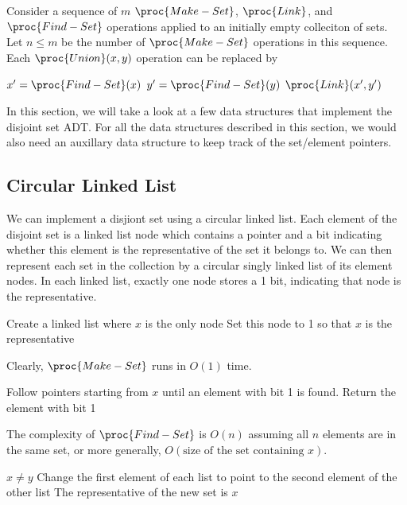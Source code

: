 Consider a sequence of $m$ $\proc{Make-Set}$, $\proc{Link}$, and $\proc{Find-Set}$ operations applied to an initially empty colleciton of sets. Let $n \leq m$ be the number of $\proc{Make-Set}$ operations in this sequence. Each $\proc{Union}(x,y)$ operation can be replaced by

\begin{codebox}
    \li $x' = \proc{Find-Set}(x)$
    \li $y' = \proc{Find-Set}(y)$
    \li $\proc{Link}(x',y')$
\end{codebox}

In this section, we will take a look at a few data structures that implement the disjoint set ADT. For all the data structures described in this section, we would also need an auxillary data structure to keep track of the set/element pointers.

\subsection{Circular Linked List}

We can implement a disjiont set using a circular linked list. Each element of the disjoint set is a linked list node which contains a  pointer and a bit indicating whether this element is the representative of the set it belongs to. We can then represent each set in the collection by a circular singly linked list of its element nodes. In each linked list, exactly one node stores a 1 bit, indicating that node is the representative.

\begin{codebox}
    \zi Create a linked list where $x$ is the only node
    \zi Set this node to 1 so that $x$ is the representative
\end{codebox}

Clearly, $\proc{Make-Set}$ runs in $O(1)$ time.

\begin{codebox}
    \zi Follow pointers starting from $x$ until an element with bit 1 is found. 
    \zi Return the element with bit 1
\end{codebox}

The complexity of $\proc{Find-Set}$ is $O(n)$ assuming all $n$ elements are in the same set, or more generally, $O(\text{size of the set containing $x$})$.

\begin{codebox}
    \zi \If $x \neq y$ \Then
    \zi Change the first element of each list to point to the second element 
    \zi of the other list \End
    \zi The representative of the new set is $x$ 
\end{codebox}

